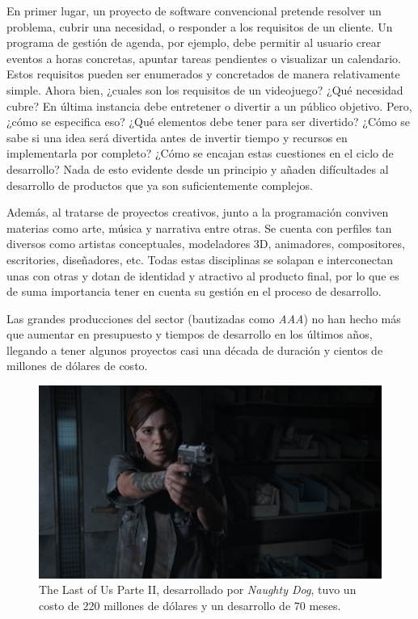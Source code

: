 En primer lugar, un proyecto de software convencional pretende resolver un problema, cubrir una necesidad, o responder a los requisitos de un cliente. Un programa de gestión de agenda, por ejemplo, debe permitir al usuario crear eventos a horas concretas, apuntar tareas pendientes o visualizar un calendario. Estos requisitos pueden ser enumerados y concretados de manera relativamente simple. Ahora bien, ¿cuales son los requisitos de un videojuego? ¿Qué necesidad cubre? En última instancia debe entretener o divertir a un público objetivo. Pero, ¿cómo se especifica eso? ¿Qué elementos debe tener para ser divertido? ¿Cómo se sabe si una idea será divertida antes de invertir tiempo y recursos en implementarla por completo? ¿Cómo se encajan estas cuestiones en el ciclo de desarrollo? Nada de esto evidente desde un principio y añaden difícultades al desarrollo de productos que ya son suficientemente complejos.

Además, al tratarse de proyectos creativos, junto a la programación conviven materias como arte, música y narrativa entre otras. Se cuenta con perfiles tan diversos como artistas conceptuales, modeladores 3D, animadores, compositores, escritories, diseñadores, etc. Todas estas disciplinas se solapan e interconectan unas con otras y dotan de identidad y atractivo al producto final, por lo que es de suma importancia tener en cuenta su gestión en el proceso de desarrollo.

Las grandes producciones del sector (bautizadas como \textit{AAA}) no han hecho más que aumentar en presupuesto y tiempos de desarrollo en los últimos años, llegando a tener algunos proyectos casi una década de duración y cientos de millones de dólares de costo.

\begin{figure}[h]
    \centering
    \includegraphics[scale=0.15]{img/tlou.jpg}
    \caption[The Last of Us Parte II]{The Last of Us Parte II, desarrollado por \textit{Naughty Dog}, tuvo un costo de 220 millones de dólares y un desarrollo de 70 meses.}
    \label{fig:tlou2}
\end{figure}

